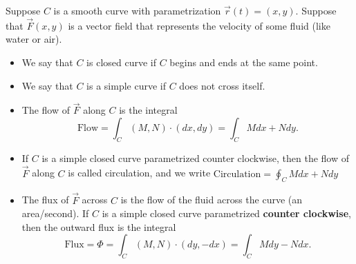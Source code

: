 \begin{definition}
%
 Suppose $C$ is a smooth curve with parametrization $\vec r(t)=(x,y)$.  Suppose that $\vec F(x,y)$ is a vector field that represents the velocity of some fluid (like water or air).  
\begin{itemize}
 \item We say that $C$ is closed curve if $C$ begins and ends at the same point.
 \item We say that $C$ is a simple curve if $C$ does not cross itself. 
 \item The flow of $\vec F$ along $C$ is the integral $$\text{Flow} = \int_C (M,N)\cdot (dx,dy) = \int_C Mdx+Ndy.$$
 \item If $C$ is a simple closed curve parametrized counter clockwise, then the flow of $\vec F$ along $C$ is called circulation, and we write 
$\text{Circulation} = \oint_C Mdx+Ndy$
 \item The flux of $\vec F$ across $C$ is the flow of the fluid across the curve (an area/second). If $C$ is a simple closed curve parametrized \textbf{counter clockwise}, then the outward flux is the integral   
$$\text{Flux} = \Phi = \int_C(M,N)\cdot (dy,-dx) =\int_C Mdy-Ndx .$$
\end{itemize}

\end{definition}

